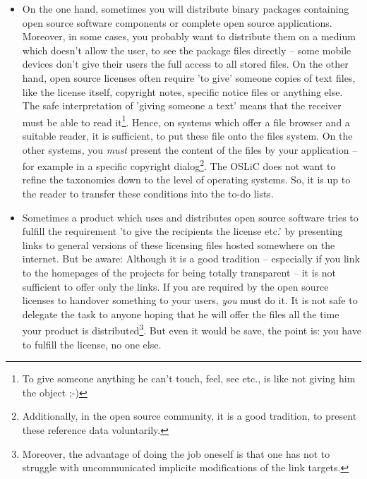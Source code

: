 \label{DistributingFilesHint}
\begin{itemize}
  \item On the one hand, sometimes you will distribute binary packages
  containing open source software components or complete open source
  applications. Moreover, in some cases, you probably want to distribute them on
  a medium which doesn't allow the user, to see the package files directly --
  some mobile devices don't give their users the full access to all stored
  files. On the other hand, open source licenses often require 'to give' someone
  copies of text files, like the license itself, copyright notes, specific
  notice files or anything else. The safe interpretation of 'giving someone a
  text' means that the receiver must be able to read it\footnote{To give someone
  anything he can't touch, feel, see etc., is like not giving him the object
  ;-)}. Hence, on systems which offer a file browser and a suitable reader, it
  is sufficient, to put these file onto the files system. On the other systems,
  you \emph{must} present the content of the files by your application -- for
  example in a specific copyright dialog\footnote{Additionally, in the open
  source community, it is a good tradition, to present these reference data
  voluntarily.}. The OSLiC does not want to refine the taxonomies down to the
  level of operating systems. So, it is up to the reader to transfer these
  conditions into the to-do lists.
  
  \item Sometimes a product which uses and distributes open source software
  tries to fulfill the requirement 'to give the recipients the license etc.' by
  presenting links to general versions of these licensing files hosted somewhere
  on the internet. But be aware: Although it is a good tradition -- especially
  if you link to the homepages of the projects for being totally transparent --
  it is not sufficient to offer only the links. If you are required by the open
  source licenses to handover something to your users, \emph{you} must do it. It
  is not safe to delegate the task to anyone hoping that he will offer the files
  all the time your product is distributed\footnote{Moreover, the advantage
  of doing the job oneself is that one has not to struggle with uncommunicated
  implicite modifications of the link targets.}. But even it would be save, the
  point is: you have to fulfill the license, no one else.
\end{itemize}

\label{OSUCToDoLists}